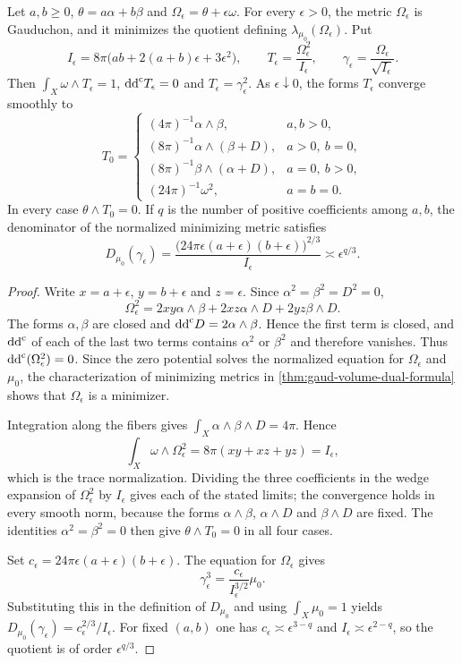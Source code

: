 \begin{proposition}\label{prop:elliptic-gauduchon-limits}
Let $a,b\geq0$, $\theta=a\alpha+b\beta$ and $\Omega_\epsilon=\theta+\epsilon\omega$. For every $\epsilon>0$, the metric $\Omega_\epsilon$ is Gauduchon, and it minimizes the quotient defining $\lambda_{\mu_0}(\Omega_\epsilon)$. Put
\[
 I_\epsilon=8\pi\bigl(ab+2(a+b)\epsilon+3\epsilon^2\bigr),
 \qquad T_\epsilon=\frac{\Omega_\epsilon^2}{I_\epsilon},
 \qquad \gamma_\epsilon=\frac{\Omega_\epsilon}{\sqrt{I_\epsilon}}.
\]
Then $\int_X\omega\wedge T_\epsilon=1$, $\mathrm{dd}^{\mathrm{c}} T_\epsilon=0$ and $T_\epsilon=\gamma_\epsilon^2$. As $\epsilon\downarrow0$, the forms $T_\epsilon$ converge smoothly to
\[
 T_0=\begin{cases}
       (4\pi)^{-1}\alpha\wedge\beta,&a,b>0,\\
       (8\pi)^{-1}\alpha\wedge(\beta+D),&a>0,\ b=0,\\
       (8\pi)^{-1}\beta\wedge(\alpha+D),&a=0,\ b>0,\\
       (24\pi)^{-1}\omega^2,&a=b=0.
      \end{cases}
\]
In every case $\theta\wedge T_0=0$. If $q$ is the number of positive coefficients among $a,b$, the denominator of the normalized minimizing metric satisfies
\[
 D_{\mu_0}(\gamma_\epsilon)
  =\frac{\bigl(24\pi\epsilon(a+\epsilon)(b+\epsilon)\bigr)^{2/3}}
         {I_\epsilon}
  \asymp\epsilon^{q/3}.
\]
\end{proposition}
\begin{proof}
Write $x=a+\epsilon$, $y=b+\epsilon$ and $z=\epsilon$. Since $\alpha^2=\beta^2=D^2=0$,
\[
 \Omega_\epsilon^2
   =2xy\alpha\wedge\beta+2xz\alpha\wedge D+2yz\beta\wedge D.
\]
The forms $\alpha,\beta$ are closed and $\mathrm{dd}^{\mathrm{c}} D=2\alpha\wedge\beta$. Hence the first term is closed, and $\mathrm{dd}^{\mathrm{c}}$ of each of the last two terms contains $\alpha^2$ or $\beta^2$ and therefore vanishes. Thus $\mathrm{dd}^{\mathrm{c}}(\Omega_\epsilon^2)=0$. Since the zero potential solves the normalized equation for $\Omega_\epsilon$ and $\mu_0$, the characterization of minimizing metrics in \cref{thm:gaud-volume-dual-formula} shows that $\Omega_\epsilon$ is a minimizer.

Integration along the fibers gives $\int_X\alpha\wedge\beta\wedge D=4\pi$. Hence
\[
 \int_X\omega\wedge\Omega_\epsilon^2
   =8\pi(xy+xz+yz)=I_\epsilon,
\]
which is the trace normalization. Dividing the three coefficients in the wedge expansion of $\Omega_\epsilon^2$ by $I_\epsilon$ gives each of the stated limits; the convergence holds in every smooth norm, because the forms $\alpha\wedge\beta$, $\alpha\wedge D$ and $\beta\wedge D$ are fixed. The identities $\alpha^2=\beta^2=0$ then give $\theta\wedge T_0=0$ in all four cases.

Set $c_\epsilon=24\pi\epsilon(a+\epsilon)(b+\epsilon)$. The equation for $\Omega_\epsilon$ gives
\[
 \gamma_\epsilon^3
    =\frac{c_\epsilon}{I_\epsilon^{3/2}}\mu_0.
\]
Substituting this in the definition of $D_{\mu_0}$ and using $\int_X\mu_0=1$ yields $D_{\mu_0}(\gamma_\epsilon)=c_\epsilon^{2/3}/I_\epsilon$. For fixed $(a,b)$ one has $c_\epsilon\asymp\epsilon^{3-q}$ and $I_\epsilon\asymp\epsilon^{2-q}$, so the quotient is of order $\epsilon^{q/3}$.
\end{proof}

